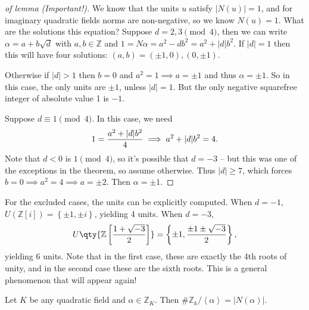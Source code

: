 \begin{proof}[of lemma (Important!)]

We know that the units \(u\) satisfy
\({\left\lvert {N(u)} \right\rvert} = 1\), and for imaginary quadratic
fields norms are non-negative, so we know \(N(u) = 1\). What are the
solutions this equation? Suppose \(d=2,3 \pmod 4\), then we can write
\(\alpha = a + b \sqrt{d}\) with \(a,b\in {\mathbb{Z}}\) and
\(1 = N \alpha = a^2 - db^2 = a^2 + {\left\lvert {d} \right\rvert}b^2\).
If \({\left\lvert {d} \right\rvert}= 1\) then this will have four
solutions: \((a, b) = (\pm 1, 0), (0, \pm 1)\).

\hfill\break

Otherwise if \({\left\lvert {d} \right\rvert}> 1\) then \(b=0\) and
\(a^2=1 \implies a = \pm 1\) and thus \(\alpha = \pm 1\). So in this
case, the only units are \(\pm 1\), unless
\({\left\lvert {d} \right\rvert} = 1\). But the only negative squarefree
integer of absolute value 1 is \(-1\).

Suppose \(d \equiv 1 \pmod 4\). In this case, we need
\begin{align*}
1 = {a^2 + {\left\lvert {d} \right\rvert} b^2 \over 4} \implies a^2 + {\left\lvert {d} \right\rvert}b^2 = 4  
.\end{align*}
Note that \(d<0\) is \(1\pmod 4\), so it's possible that \(d=-3\) -- but
this was one of the exceptions in the theorem, so assume otherwise. Thus
\({\left\lvert {d} \right\rvert}\geq 7\), which forces
\(b=0 \implies a^2 = 4 \implies a = \pm 2\). Then \(\alpha= \pm 1\).

\end{proof}

\begin{remark}

For the excluded cases, the units can be explicitly computed. When
\(d=-1\), \(U({\mathbb{Z}}[i]) =\left\{{\pm 1, \pm i}\right\}\),
yielding 4 units. When \(d=-3\),
\begin{align*}
U\qty{{\mathbb{Z}}\left[ {1 + \sqrt{-3} \over 2 } \right]} = \left\{{\pm 1, {\pm 1 \pm \sqrt{-3} \over 2}}\right\}
,\end{align*}
yielding 6 units. Note that in the first case, these are exactly the 4th
roots of unity, and in the second case these are the sixth roots. This
is a general phenomenon that will appear again!

\end{remark}

\begin{lemma}

Let \(K\) be any quadratic field and \(\alpha\in {\mathbb{Z}}_K\). Then
\(\# {\mathbb{Z}}_k / \left\langle{ \alpha }\right\rangle = {\left\lvert {N( \alpha )} \right\rvert}\).

\end{lemma}

